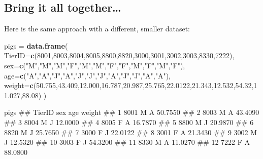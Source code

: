 \documentclass[]{book}
\newenvironment{Shaded}{\begin{snugshade}}{\end{snugshade}}
\newcommand{\KeywordTok}[1]{\textcolor[rgb]{0.13,0.29,0.53}{\textbf{#1}}}
\newcommand{\DataTypeTok}[1]{\textcolor[rgb]{0.13,0.29,0.53}{#1}}
\newcommand{\DecValTok}[1]{\textcolor[rgb]{0.00,0.00,0.81}{#1}}
\newcommand{\FloatTok}[1]{\textcolor[rgb]{0.00,0.00,0.81}{#1}}
\newcommand{\StringTok}[1]{\textcolor[rgb]{0.31,0.60,0.02}{#1}}
\newcommand{\NormalTok}[1]{#1}
\begin{document}
\subsection{Bring it all together\ldots{}}\label{bring-it-all-together}

Here is the same approach with a different, smaller dataset:

\begin{Shaded}
\begin{Highlighting}[]
\NormalTok{pigs =}\StringTok{ }\KeywordTok{data.frame}\NormalTok{(}
  \DataTypeTok{TierID=}\KeywordTok{c}\NormalTok{(}\DecValTok{8001}\NormalTok{,}\DecValTok{8003}\NormalTok{,}\DecValTok{8004}\NormalTok{,}\DecValTok{8005}\NormalTok{,}\DecValTok{8800}\NormalTok{,}\DecValTok{8820}\NormalTok{,}\DecValTok{3000}\NormalTok{,}\DecValTok{3001}\NormalTok{,}\DecValTok{3002}\NormalTok{,}\DecValTok{3003}\NormalTok{,}\DecValTok{8330}\NormalTok{,}\DecValTok{7222}\NormalTok{),}
  \DataTypeTok{sex=}\KeywordTok{c}\NormalTok{(}\StringTok{"M"}\NormalTok{,}\StringTok{"M"}\NormalTok{,}\StringTok{"M"}\NormalTok{,}\StringTok{"F"}\NormalTok{,}\StringTok{"M"}\NormalTok{,}\StringTok{"M"}\NormalTok{,}\StringTok{"F"}\NormalTok{,}\StringTok{"F"}\NormalTok{,}\StringTok{"M"}\NormalTok{,}\StringTok{"F"}\NormalTok{,}\StringTok{"M"}\NormalTok{,}\StringTok{"F"}\NormalTok{),}
  \DataTypeTok{age=}\KeywordTok{c}\NormalTok{(}\StringTok{"A"}\NormalTok{,}\StringTok{"A"}\NormalTok{,}\StringTok{"J"}\NormalTok{,}\StringTok{"A"}\NormalTok{,}\StringTok{"J"}\NormalTok{,}\StringTok{"J"}\NormalTok{,}\StringTok{"J"}\NormalTok{,}\StringTok{"A"}\NormalTok{,}\StringTok{"J"}\NormalTok{,}\StringTok{"J"}\NormalTok{,}\StringTok{"A"}\NormalTok{,}\StringTok{"A"}\NormalTok{),}
  \DataTypeTok{weight=}\KeywordTok{c}\NormalTok{(}\FloatTok{50.755}\NormalTok{,}\FloatTok{43.409}\NormalTok{,}\FloatTok{12.000}\NormalTok{,}\FloatTok{16.787}\NormalTok{,}\FloatTok{20.987}\NormalTok{,}\FloatTok{25.765}\NormalTok{,}\FloatTok{22.0122}\NormalTok{,}\FloatTok{21.343}\NormalTok{,}\FloatTok{12.532}\NormalTok{,}\FloatTok{54.32}\NormalTok{,}\FloatTok{11.027}\NormalTok{,}\FloatTok{88.08}\NormalTok{)}
\NormalTok{)}

\NormalTok{pigs}
\NormalTok{##    TierID sex age  weight}
\NormalTok{## 1    8001   M   A 50.7550}
\NormalTok{## 2    8003   M   A 43.4090}
\NormalTok{## 3    8004   M   J 12.0000}
\NormalTok{## 4    8005   F   A 16.7870}
\NormalTok{## 5    8800   M   J 20.9870}
\NormalTok{## 6    8820   M   J 25.7650}
\NormalTok{## 7    3000   F   J 22.0122}
\NormalTok{## 8    3001   F   A 21.3430}
\NormalTok{## 9    3002   M   J 12.5320}
\NormalTok{## 10   3003   F   J 54.3200}
\NormalTok{## 11   8330   M   A 11.0270}
\NormalTok{## 12   7222   F   A 88.0800}


\end{Highlighting}
\end{Shaded}
\end{document}
